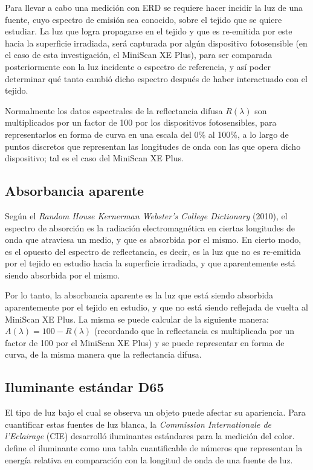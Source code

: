		Para llevar a cabo una medici\'{o}n con ERD se requiere hacer incidir la luz de una fuente, cuyo espectro de emisi\'{o}n sea conocido, sobre el tejido que se quiere estudiar. La luz que logra propagarse en el tejido y que es re-emitida por este hacia la superficie irradiada, ser\'{a} capturada por alg\'{u}n dispositivo fotosensible (en el caso de esta investigaci\'{o}n, el MiniScan XE Plus), para ser comparada posteriormente con la luz incidente o espectro de referencia, y as\'{i} poder determinar qu\'{e} tanto cambi\'{o} dicho espectro despu\'{e}s de haber interactuado con el tejido.
		
		Normalmente los datos espectrales de la reflectancia difusa $R(\lambda)$ son multiplicados por un factor de 100 por los dispositivos fotosensibles, para representarlos en forma de curva en una escala del 0\% al 100\%, a lo largo de puntos discretos que representan las longitudes de onda con las que opera dicho dispositivo; tal es el caso del MiniScan XE Plus.
	
	\subsection{Absorbancia aparente}
	
	Seg\'{u}n el \textit{Random House Kernerman Webster's College Dictionary} (2010), el espectro de absorci\'{o}n es la radiaci\'{o}n electromagn\'{e}tica en ciertas longitudes de onda que atraviesa un medio, y que es absorbida por el mismo. En cierto modo, es el opuesto del espectro de reflectancia, es decir, es la luz que no es re-emitida por el tejido en estudio hacia la superficie irradiada, y que aparentemente est\'{a} siendo absorbida por el mismo. 
	
	Por lo tanto, la absorbancia aparente es la luz que est\'{a} siendo absorbida aparentemente por el tejido en estudio, y que no est\'{a} siendo reflejada de vuelta al MiniScan XE Plus. La misma se puede calcular de la siguiente manera: $A(\lambda) = 100 - R(\lambda)$ (recordando que la reflectancia es multiplicada por un factor de 100 por el MiniScan XE Plus) y se puede representar en forma de curva, de la misma manera que la reflectancia difusa.

	\subsection{Iluminante est\'{a}ndar D65}
		
		El tipo de luz bajo el cual se observa un objeto puede afectar su apariencia. Para cuantificar estas fuentes de luz blanca, la \textit{Commission Internationale de l'Eclairage} (CIE) desarroll\'{o} iluminantes est\'{a}ndares para la medici\'{o}n del color.
		\cite{HunterLab} define el iluminante como una tabla cuantificable de n\'{u}meros que representan la energ\'{i}a relativa en comparaci\'{o}n con la longitud de onda de una fuente de luz. 
		
